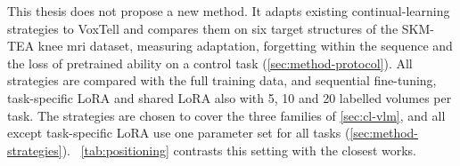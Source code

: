 This thesis does not propose a new method.
It adapts existing continual-learning strategies to VoxTell and compares them on six target structures of the SKM-TEA knee \gls{mri} dataset, measuring adaptation, forgetting within the sequence and the loss of pretrained ability on a control task (\cref{sec:method-protocol}).
All strategies are compared with the full training data, and sequential fine-tuning, task-specific LoRA and shared LoRA also with 5, 10 and 20 labelled volumes per task.
The strategies are chosen to cover the three families of \cref{sec:cl-vlm}, and all except task-specific LoRA use one parameter set for all tasks (\cref{sec:method-strategies}).
\tablename~\ref{tab:positioning} contrasts this setting with the closest works.




